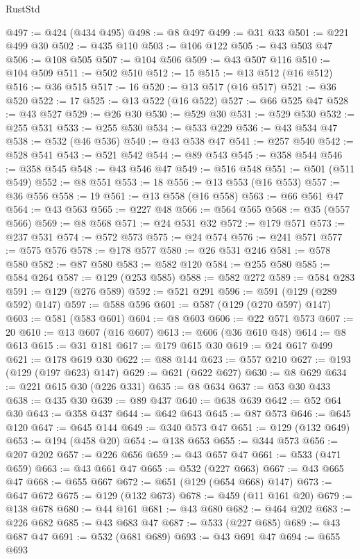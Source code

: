 \begin{lexlean}{RustStd}
\begin{coremodule}
@497 := @424 (@434 @495)
@498 := @8 @497
@499 := @31 @33
@501 := @221 @499 @30
@502 := @435 @110
@503 := @106 @122
@505 := @43 @503 @47
@506 := @108 @505
@507 := @104 @506
@509 := @43 @507 @116
@510 := @104 @509
@511 := @502 @510
@512 := 15
@515 := @13 @512 (@16 @512)
@516 := @36 @515
@517 := 16
@520 := @13 @517 (@16 @517)
@521 := @36 @520
@522 := 17
@525 := @13 @522 (@16 @522)
@527 := @66 @525 @47
@528 := @43 @527
@529 := @26 @30
@530 := @529 @30
@531 := @529 @530
@532 := @255 @531
@533 := @255 @530
@534 := @533 @229
@536 := @43 @534 @47
@538 := @532 (@46 @536)
@540 := @43 @538 @47
@541 := @257 @540
@542 := @528 @541
@543 := @521 @542
@544 := @89 @543
@545 := @358 @544
@546 := @358 @545
@548 := @43 @546 @47
@549 := @516 @548
@551 := @501 (@511 @549)
@552 := @8 @551
@553 := 18
@556 := @13 @553 (@16 @553)
@557 := @36 @556
@558 := 19
@561 := @13 @558 (@16 @558)
@563 := @66 @561 @47
@564 := @43 @563
@565 := @227 @48
@566 := @564 @565
@568 := @35 (@557 @566)
@569 := @8 @568
@571 := @24 @531 @32
@572 := @179 @571
@573 := @237 @531
@574 := @572 @573
@575 := @24 @574
@576 := @241 @571
@577 := @575 @576
@578 := @178 @577
@580 := @26 @531 @246
@581 := @578 @580
@582 := @87 @580
@583 := @582 @120
@584 := @255 @580
@585 := @584 @264
@587 := @129 (@253 @585)
@588 := @582 @272
@589 := @584 @283
@591 := @129 (@276 @589)
@592 := @521 @291
@596 := @591 (@129 (@289 @592) @147)
@597 := @588 @596
@601 := @587 (@129 (@270 @597) @147)
@603 := @581 (@583 @601)
@604 := @8 @603
@606 := @22 @571 @573
@607 := 20
@610 := @13 @607 (@16 @607)
@613 := @606 (@36 @610 @48)
@614 := @8 @613
@615 := @31 @181
@617 := @179 @615 @30
@619 := @24 @617 @499
@621 := @178 @619 @30
@622 := @88 @144
@623 := @557 @210
@627 := @193 (@129 (@197 @623) @147)
@629 := @621 (@622 @627)
@630 := @8 @629
@634 := @221 @615 @30 (@226 @331)
@635 := @8 @634
@637 := @53 @30 @433
@638 := @435 @30
@639 := @89 @437
@640 := @638 @639
@642 := @52 @64 @30
@643 := @358 @437
@644 := @642 @643
@645 := @87 @573
@646 := @645 @120
@647 := @645 @144
@649 := @340 @573 @47
@651 := @129 (@132 @649)
@653 := @194 (@458 @20)
@654 := @138 @653
@655 := @344 @573
@656 := @207 @202
@657 := @226 @656
@659 := @43 @657 @47
@661 := @533 (@471 @659)
@663 := @43 @661 @47
@665 := @532 (@227 @663)
@667 := @43 @665 @47
@668 := @655 @667
@672 := @651 (@129 (@654 @668) @147)
@673 := @647 @672
@675 := @129 (@132 @673)
@678 := @459 (@11 @161 @20)
@679 := @138 @678
@680 := @44 @161
@681 := @43 @680
@682 := @464 @202
@683 := @226 @682
@685 := @43 @683 @47
@687 := @533 (@227 @685)
@689 := @43 @687 @47
@691 := @532 (@681 @689)
@693 := @43 @691 @47
@694 := @655 @693

\end{coremodule}
\end{lexlean}
